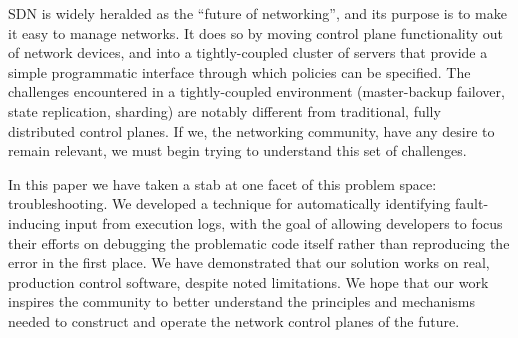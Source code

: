 
SDN is widely heralded as the ``future of networking'', and its purpose is to make
it easy to manage networks. It does so by moving control plane functionality out of
network devices, and into a tightly-coupled cluster of servers that provide a simple
programmatic interface through which policies can be specified. The challenges encountered
in a tightly-coupled environment (master-backup failover, state replication, sharding) are
notably different from traditional, fully distributed control planes. If we,
the networking community, have any desire to remain relevant, we must begin trying
to understand this set of challenges.

In this paper we have taken a stab at one facet of this problem space:
troubleshooting. We developed a technique for automatically
identifying fault-inducing input from execution logs, with the
goal of allowing developers to focus their efforts on debugging the problematic
code itself rather than reproducing the error in the first place. We have
demonstrated that our solution works on real, production control software,
despite noted limitations. We hope that our work inspires the community to
better understand the principles and mechanisms needed to construct and
operate the network control planes of the future.

